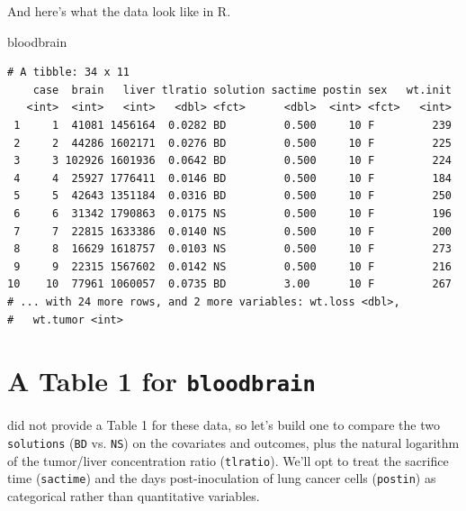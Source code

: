 \documentclass[]{book}
\newenvironment{Shaded}{\begin{snugshade}}{\end{snugshade}}
\newcommand{\KeywordTok}[1]{\textcolor[rgb]{0.13,0.29,0.53}{\textbf{#1}}}
\newcommand{\DataTypeTok}[1]{\textcolor[rgb]{0.13,0.29,0.53}{#1}}
\newcommand{\StringTok}[1]{\textcolor[rgb]{0.31,0.60,0.02}{#1}}
\newcommand{\OperatorTok}[1]{\textcolor[rgb]{0.81,0.36,0.00}{\textbf{#1}}}
\newcommand{\NormalTok}[1]{#1}
\theoremstyle{definition}
\theoremstyle{definition}
\theoremstyle{definition}
\theoremstyle{remark}
\begin{document}
And here's what the data look like in R.

\begin{Shaded}
\begin{Highlighting}[]
\NormalTok{bloodbrain}
\end{Highlighting}
\end{Shaded}

\begin{verbatim}
# A tibble: 34 x 11
    case  brain   liver tlratio solution sactime postin sex   wt.init
   <int>  <int>   <int>   <dbl> <fct>      <dbl>  <int> <fct>   <int>
 1     1  41081 1456164  0.0282 BD         0.500     10 F         239
 2     2  44286 1602171  0.0276 BD         0.500     10 F         225
 3     3 102926 1601936  0.0642 BD         0.500     10 F         224
 4     4  25927 1776411  0.0146 BD         0.500     10 F         184
 5     5  42643 1351184  0.0316 BD         0.500     10 F         250
 6     6  31342 1790863  0.0175 NS         0.500     10 F         196
 7     7  22815 1633386  0.0140 NS         0.500     10 F         200
 8     8  16629 1618757  0.0103 NS         0.500     10 F         273
 9     9  22315 1567602  0.0142 NS         0.500     10 F         216
10    10  77961 1060057  0.0735 BD         3.00      10 F         267
# ... with 24 more rows, and 2 more variables: wt.loss <dbl>,
#   wt.tumor <int>
\end{verbatim}

\section{\texorpdfstring{A Table 1 for
\texttt{bloodbrain}}{A Table 1 for bloodbrain}}\label{a-table-1-for-bloodbrain}

\citet{Barnett1995} did not provide a Table 1 for these data, so let's
build one to compare the two \texttt{solutions} (\texttt{BD} vs.
\texttt{NS}) on the covariates and outcomes, plus the natural logarithm
of the tumor/liver concentration ratio (\texttt{tlratio}). We'll opt to
treat the sacrifice time (\texttt{sactime}) and the days
post-inoculation of lung cancer cells (\texttt{postin}) as categorical
rather than quantitative variables.

\begin{Shaded}
\end{Shaded}
\end{document}

